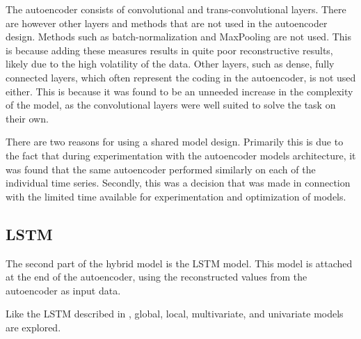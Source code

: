 The autoencoder consists of convolutional and trans-convolutional layers.
There are however other layers and methods that are not used in the autoencoder design.
Methods such as batch-normalization and MaxPooling are not used.
This is because adding these measures results in quite poor reconstructive results,
likely due to the high volatility of the data.
Other layers, such as dense, fully connected layers, which often represent the coding in the autoencoder,
is not used either.
This is because it was found to be an unneeded increase in the complexity of the model,
as the convolutional layers were well suited to solve the task on their own.


There are two reasons for using a shared model design.
Primarily this is due to the fact that during experimentation with the autoencoder models architecture,
it was found that the same autoencoder performed similarly on each of the individual time series.
Secondly, this was a decision that was made in connection with the limited time available for experimentation and optimization of models.



\subsection{LSTM}

The second part of the hybrid model is the LSTM model.
This model is attached at the end of the autoencoder,
using the reconstructed values from the autoencoder as input data.


Like the LSTM described in ,
global, local, multivariate, and univariate models are explored.





